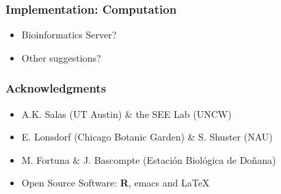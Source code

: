 \documentclass[serif,mathserif]{beamer}
\begin{document}
\begin{frame}
  \frametitle{Implementation: Computation}
  \begin{itemize}
  \item Bioinformatics Server?  
  \item Other suggestions?  
  \end{itemize}
\end{frame}







\begin{frame}
  \frametitle{Acknowledgments}
  \begin{itemize}
  \item A.K. Salas (UT Austin) \& the SEE Lab (UNCW)
  \item E. Lonsdorf (Chicago Botanic Garden) \& S. Shuster (NAU)
  \item M. Fortuna \& J. Bascompte (Estaci\'{o}n Biol\'{o}gica
    de Do\~{n}ana)
  \item Open Source Software: \textbf{R}, emacs and \LaTeX
  \end{itemize}
\end{frame}


\begin{frame}
  \frametitle{}
\end{frame}


\end{document}
